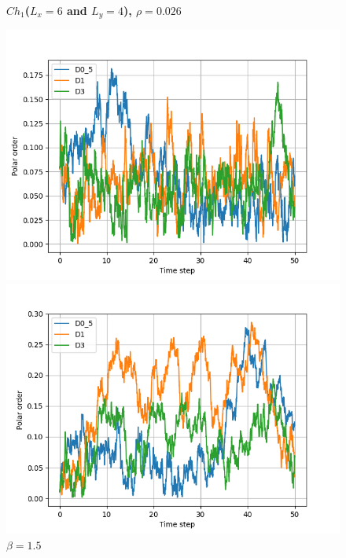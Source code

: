 \documentclass{article}
\begin{document}
\begin{figure}[H]
    \centering
    \textbf{$Ch_1$($L_x = 6$ and $L_y = 4$), $\rho = 0.026$}\par\medskip
    \begin{minipage}{0.49\textwidth}
        \includegraphics[width=1\textwidth]{videos/simulations/sim_D/beta0/dens_0_26/combined_polars.png}
        \caption{\footnotesize $\beta = 0$}
    \end{minipage}\hfill
    \begin{minipage}{0.49\textwidth}
        \includegraphics[width=1\textwidth]{videos/simulations/sim_D/beta1_5/dens_0_26/combined_polars.png}
        \caption{\footnotesize $\beta = 1.5$}
    \end{minipage}
\end{figure}
\end{document}
